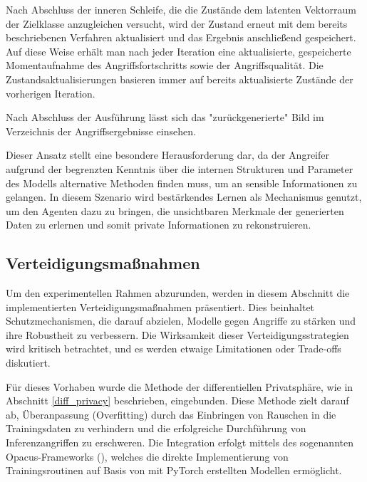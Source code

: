 Nach Abschluss der inneren Schleife, die die Zustände dem latenten Vektorraum der Zielklasse anzugleichen versucht, wird der Zustand erneut mit dem bereits beschriebenen Verfahren aktualisiert und das Ergebnis anschließend gespeichert. Auf diese Weise erhält man nach jeder Iteration eine aktualisierte, gespeicherte Momentaufnahme des Angriffsfortschritts sowie der Angriffsqualität. Die Zustandsaktualisierungen basieren immer auf bereits aktualisierte Zustände der vorherigen Iteration.

Nach Abschluss der Ausführung lässt sich das "zurückgenerierte" Bild im Verzeichnis der Angriffsergebnisse einsehen.

Dieser Ansatz stellt eine besondere Herausforderung dar, da der Angreifer aufgrund der begrenzten Kenntnis über die internen Strukturen und Parameter des Modells alternative Methoden finden muss, um an sensible Informationen zu gelangen. In diesem Szenario wird bestärkendes Lernen als Mechanismus genutzt, um den Agenten dazu zu bringen, die unsichtbaren Merkmale der generierten Daten zu erlernen und somit private Informationen zu rekonstruieren.
\subsection{Verteidigungsmaßnahmen}
Um den experimentellen Rahmen abzurunden, werden in diesem Abschnitt die implementierten Verteidigungsmaßnahmen präsentiert. Dies beinhaltet Schutzmechanismen, die darauf abzielen, Modelle gegen Angriffe zu stärken und ihre Robustheit zu verbessern. Die Wirksamkeit dieser Verteidigungsstrategien wird kritisch betrachtet, und es werden etwaige Limitationen oder Trade-offs diskutiert.

Für dieses Vorhaben wurde die Methode der differentiellen Privatsphäre, wie in Abschnitt \ref{diff_privacy} beschrieben, eingebunden. Diese Methode zielt darauf ab, Überanpassung (Overfitting) durch das Einbringen von Rauschen in die Trainingsdaten zu verhindern und die erfolgreiche Durchführung von Inferenzangriffen zu erschweren. Die Integration erfolgt mittels des sogenannten Opacus-Frameworks (\cite{noauthor_opacus_nodate}), welches die direkte Implementierung von Trainingsroutinen auf Basis von mit PyTorch erstellten Modellen ermöglicht.

